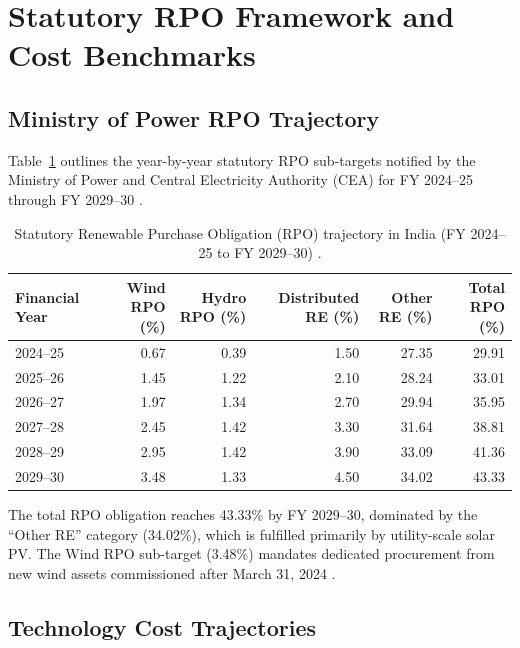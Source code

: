 \documentclass[11pt,a4paper]{article}
\begin{document}
\section{Statutory RPO Framework and Cost Benchmarks}
\label{sec:framework}

\subsection{Ministry of Power RPO Trajectory}
\label{sec:trajectory}

Table~\ref{tab:rpo_targets} outlines the year-by-year statutory RPO sub-targets notified by the Ministry of Power and Central Electricity Authority (CEA) for FY 2024--25 through FY 2029--30 \cite{CEA2023, Singh2024}.

\begin{table}[htbp]
\centering
\small
\caption{Statutory Renewable Purchase Obligation (RPO) trajectory in India (FY 2024--25 to FY 2029--30) \cite{CEA2023, Singh2024}.}
\label{tab:rpo_targets}
\begin{tabular}{lrrrrr}
\toprule
Financial Year & Wind RPO (\%) & Hydro RPO (\%) & Distributed RE (\%) & Other RE (\%) & Total RPO (\%) \\
\midrule
2024--25 & 0.67 & 0.39 & 1.50 & 27.35 & 29.91 \\
2025--26 & 1.45 & 1.22 & 2.10 & 28.24 & 33.01 \\
2026--27 & 1.97 & 1.34 & 2.70 & 29.94 & 35.95 \\
2027--28 & 2.45 & 1.42 & 3.30 & 31.64 & 38.81 \\
2028--29 & 2.95 & 1.42 & 3.90 & 33.09 & 41.36 \\
2029--30 & 3.48 & 1.33 & 4.50 & 34.02 & 43.33 \\
\bottomrule
\end{tabular}
\end{table}

The total RPO obligation reaches 43.33\% by FY 2029--30, dominated by the ``Other RE'' category (34.02\%), which is fulfilled primarily by utility-scale solar PV. The Wind RPO sub-target (3.48\%) mandates dedicated procurement from new wind assets commissioned after March 31, 2024 \cite{Takyar2024}.

\subsection{Technology Cost Trajectories}
\label{sec:costs}
\end{document}
